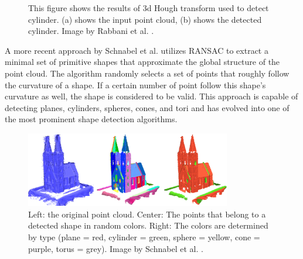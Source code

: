 \begin{figure}
\centering
{}
\caption[Results of 3d Hough transform used to detect cylinder]
{This figure shows the results of 3d Hough transform used to detect cylinder. (a) shows the input point cloud, (b) shows the detected cylinder. Image by Rabbani et al. \cite{rabbani2005efficient}.}
\label{fig:hough_cylinder}
\end{figure}


A more recent approach by Schnabel et al. \cite{schnabel-2007-efficient} utilizes RANSAC\cite{fischler1981random} to extract a minimal set of primitive shapes that approximate the global structure of the point cloud. The algorithm randomly selects a set of points that roughly follow the curvature of a shape. If a certain number of point follow this shape's curvature as well, the shape is considered to be valid. This approach is capable of detecting planes, cylinders, spheres, cones, and tori and has evolved into one of the most prominent shape detection algorithms. 

\begin{figure}
    \centering
    \includegraphics[width=0.8\textwidth]{Related_Work/schnabel_example.png}%
    \caption[Church with points colored by detected shape]
		{Left: the original point cloud. Center: The points that belong to a detected shape in random colors. Right: The colors are determined by type (plane = red, cylinder = green, sphere = yellow, cone = purple, torus = grey). Image by Schnabel et al. \cite{schnabel-2007-efficient}. }
    \label{fig:schnabel_church}
\end{figure}

